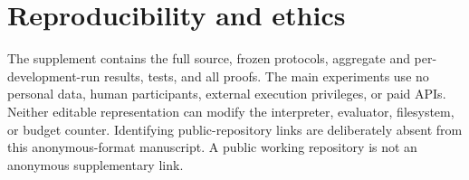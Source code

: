 \documentclass{article}
\theoremstyle{definition}
\begin{document}
\section*{Reproducibility and ethics}
The supplement contains the full source, frozen protocols, aggregate and per-development-run results, tests, and all proofs. The main experiments use no personal data, human participants, external execution privileges, or paid APIs. Neither editable representation can modify the interpreter, evaluator, filesystem, or budget counter. Identifying public-repository links are deliberately absent from this anonymous-format manuscript. A public working repository is not an anonymous supplementary link.


\clearpage
\appendix





\end{document}
